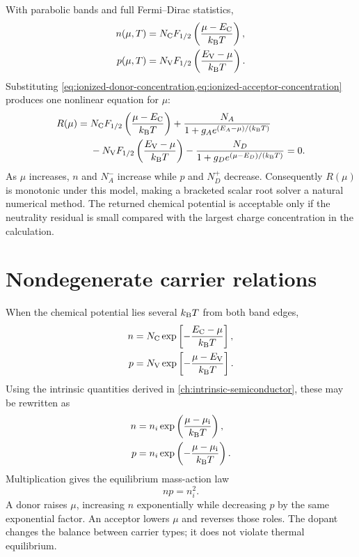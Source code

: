 With parabolic bands and full Fermi--Dirac statistics,
\begin{align}
  n(\mu,T)
  &=N_{\mathrm C} F_{1/2}\left(\frac{\mu-E_{\mathrm C}}{k_{\mathrm B} T}\right),
  \label{eq:extrinsic-exact-electrons}\\
  p(\mu,T)
  &=N_{\mathrm V} F_{1/2}\left(\frac{E_{\mathrm V}-\mu}{k_{\mathrm B} T}\right).
  \label{eq:extrinsic-exact-holes}
\end{align}
Substituting
\cref{eq:ionized-donor-concentration,eq:ionized-acceptor-concentration}
produces one nonlinear equation for $\mu$:
\begin{equation}
\begin{aligned}
  R(\mu)={}&
  N_{\mathrm C} F_{1/2}\left(\frac{\mu-E_{\mathrm C}}{k_{\mathrm B} T}\right)
  +\frac{N_A}{1+g_Ae^{(E_A-\mu)/(k_{\mathrm B} T)}}\\
  &-N_{\mathrm V} F_{1/2}\left(\frac{E_{\mathrm V}-\mu}{k_{\mathrm B} T}\right)
  -\frac{N_D}{1+g_De^{(\mu-E_D)/(k_{\mathrm B} T)}}=0.
\end{aligned}
  \label{eq:extrinsic-master-residual}
\end{equation}
As $\mu$ increases, $n$ and $N_A^-$ increase while $p$ and $N_D^+$ decrease.
Consequently $R(\mu)$ is monotonic under this model, making a bracketed scalar
root solver a natural numerical method.  The returned chemical potential is
acceptable only if the neutrality residual is small compared with the largest
charge concentration in the calculation.

\section{Nondegenerate carrier relations}

When the chemical potential lies several $k_{\mathrm B} T$ from both band edges,
\begin{align}
  n&=N_{\mathrm C}\exp\left[-\frac{E_{\mathrm C}-\mu}{k_{\mathrm B} T}\right],
  \label{eq:extrinsic-boltzmann-electrons}\\
  p&=N_{\mathrm V}\exp\left[-\frac{\mu-E_{\mathrm V}}{k_{\mathrm B} T}\right].
  \label{eq:extrinsic-boltzmann-holes}
\end{align}
Using the intrinsic quantities derived in
\cref{ch:intrinsic-semiconductor}, these may be rewritten as
\begin{align}
  n&=n_i\exp\left(\frac{\mu-\mu_{\mathrm i}}{k_{\mathrm B} T}\right),
  \label{eq:electron-concentration-relative-intrinsic}\\
  p&=n_i\exp\left(-\frac{\mu-\mu_{\mathrm i}}{k_{\mathrm B} T}\right).
  \label{eq:hole-concentration-relative-intrinsic}
\end{align}
Multiplication gives the equilibrium mass-action law
\begin{equation}
  np=n_i^2.
  \label{eq:extrinsic-mass-action-law}
\end{equation}
A donor raises $\mu$, increasing $n$ exponentially while decreasing $p$ by the
same exponential factor.  An acceptor lowers $\mu$ and reverses those roles.
The dopant changes the balance between carrier types; it does not violate
thermal equilibrium.

